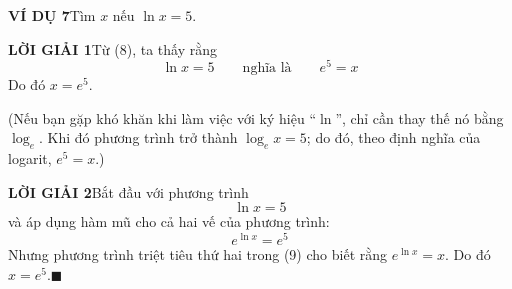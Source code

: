 \begin{minipage}[t]{0.71\textwidth}
    \vspace{12pt}
    \noindent\textbf{\textsf{\color{stewartcyan}VÍ DỤ 7}}\quad Tìm $x$ nếu $\ln x = 5$.

    \vspace{4pt}
    \noindent\textbf{\textsf{\color{stewartcyan}LỜI GIẢI 1}}\quad Từ (8), ta thấy rằng
    \[
        \ln x = 5 \qquad \text{nghĩa là} \qquad e^5 = x
    \]
    Do đó $x = e^5$.

    (Nếu bạn gặp khó khăn khi làm việc với ký hiệu ``$\ln$'', chỉ cần thay thế nó bằng $\log_e$. Khi đó phương trình trở thành $\log_e x = 5$; do đó, theo định nghĩa của logarit, $e^5 = x$.)

    \vspace{6pt}
    \noindent\textbf{\textsf{\color{stewartcyan}LỜI GIẢI 2}}\quad Bắt đầu với phương trình
    \[
        \ln x = 5
    \]
    và áp dụng hàm mũ cho cả hai vế của phương trình:
    \[
        e^{\ln x} = e^5
    \]
    Nhưng phương trình triệt tiêu thứ hai trong (9) cho biết rằng $e^{\ln x} = x$. Do đó $x = e^5$.\hfill{\color{stewartcyan}$\blacksquare$}
\end{minipage}